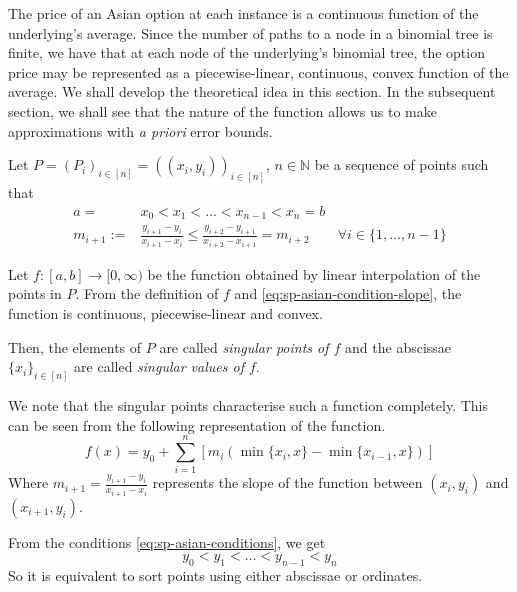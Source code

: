The price of an Asian option at each instance is a continuous function of the underlying's average. Since the number of paths to a node in a binomial tree is finite, we have that at each node of the underlying's binomial tree, the option price may be represented as a piecewise-linear, continuous, convex function of the average. We shall develop the theoretical idea in this section. In the subsequent section, we shall see that the nature of the function allows us to make approximations with \emph{a priori} error bounds.


\begin{dfn} \label{def:sp-asian-sp}
	Let $ P = (P_i)_{i \in [n]} = ( (x_i, y_i) )_{i \in [n]} $, $ n \in \mathbb{N} $ be a sequence of points such that
	\begin{subequations} \label{eq:sp-asian-conditions}
		\begin{align}
			a =& x_0 < x_1 < \dots < x_{n-1} < x_n = b \\
			\label{eq:sp-asian-condition-slope}
			m_{i+1} :=& \frac{y_{i+1} - y_{i}}{x_{i+1} - x_{i}} \le \frac{y_{i+2} - y_{i+1}}{x_{i+2} - x_{i+1}} = m_{i+2} \qquad \forall i \in \{ 1, \dots, n-1 \}
		\end{align}
	\end{subequations}
	
	Let $ f:[a,b] \to [0, \infty) $ be the function obtained by linear interpolation of the points in $P$. From the definition of $f$ and	 \ref{eq:sp-asian-condition-slope}, the function is continuous, piecewise-linear and convex.
	
	Then, the elements of $P$ are called \emph{singular points of $f$} and the abscissae $ \{ x_i \}_{i \in [n]} $ are called \emph{singular values of $f$}.
\end{dfn}


\begin{rem}
	\label{rem:sp-asian-char}
	We note that the singular points characterise such a function completely. This can be seen from the following representation of the function.
	\begin{equation}
		\label{eq:sp-asian-function-repr}
		f(x) = y_0 + \sum_{i=1}^n [ m_i ( \min \{x_{i}, x \} - \min \{ x_{i-1}, x \} ) ]
	\end{equation}
	Where $ m_{i+1} = \frac{y_{i+1} - y_{i}}{x_{i+1} - x_{i}} $ represents the slope of the function between $ (x_{i}, y_{i}) $ and $ (x_{i+1}, y_{i}) $.
\end{rem}

\begin{rem}
	From the conditions \ref{eq:sp-asian-conditions}, we get
	\begin{equation*}
		y_0 < y_1 < \dots < y_{n-1} < y_n
	\end{equation*}
	So it is equivalent to sort points using either abscissae or ordinates.
\end{rem}



